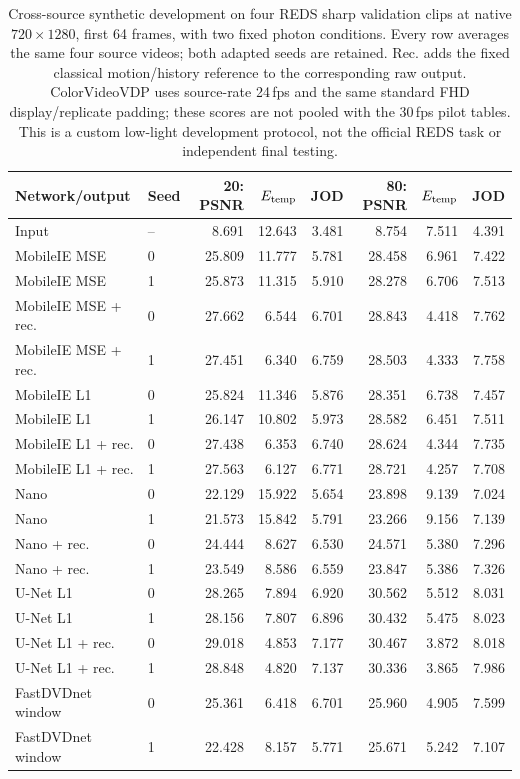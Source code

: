\begin{table}[!htbp]
\centering\small\setlength{\tabcolsep}{3pt}
\caption{Cross-source synthetic development on four REDS sharp validation clips at native $720\times1280$, first 64 frames, with two fixed photon conditions. Every row averages the same four source videos; both adapted seeds are retained. Rec. adds the fixed classical motion/history reference to the corresponding raw output. ColorVideoVDP uses source-rate 24\,fps and the same standard FHD display/replicate padding; these scores are not pooled with the 30\,fps pilot tables. This is a custom low-light development protocol, not the official REDS task or independent final testing.}
\label{tab:external-reds}
\begin{tabular}{llrrrrrr}
\toprule
Network/output & Seed & 20: PSNR & $E_{\rm temp}$ & JOD & 80: PSNR & $E_{\rm temp}$ & JOD\\
\midrule
Input & -- & 8.691 & 12.643 & 3.481 & 8.754 & 7.511 & 4.391\\
MobileIE MSE & 0 & 25.809 & 11.777 & 5.781 & 28.458 & 6.961 & 7.422\\
MobileIE MSE & 1 & 25.873 & 11.315 & 5.910 & 28.278 & 6.706 & 7.513\\
MobileIE MSE + rec. & 0 & 27.662 & 6.544 & 6.701 & 28.843 & 4.418 & 7.762\\
MobileIE MSE + rec. & 1 & 27.451 & 6.340 & 6.759 & 28.503 & 4.333 & 7.758\\
MobileIE L1 & 0 & 25.824 & 11.346 & 5.876 & 28.351 & 6.738 & 7.457\\
MobileIE L1 & 1 & 26.147 & 10.802 & 5.973 & 28.582 & 6.451 & 7.511\\
MobileIE L1 + rec. & 0 & 27.438 & 6.353 & 6.740 & 28.624 & 4.344 & 7.735\\
MobileIE L1 + rec. & 1 & 27.563 & 6.127 & 6.771 & 28.721 & 4.257 & 7.708\\
Nano & 0 & 22.129 & 15.922 & 5.654 & 23.898 & 9.139 & 7.024\\
Nano & 1 & 21.573 & 15.842 & 5.791 & 23.266 & 9.156 & 7.139\\
Nano + rec. & 0 & 24.444 & 8.627 & 6.530 & 24.571 & 5.380 & 7.296\\
Nano + rec. & 1 & 23.549 & 8.586 & 6.559 & 23.847 & 5.386 & 7.326\\
U-Net L1 & 0 & 28.265 & 7.894 & 6.920 & 30.562 & 5.512 & 8.031\\
U-Net L1 & 1 & 28.156 & 7.807 & 6.896 & 30.432 & 5.475 & 8.023\\
U-Net L1 + rec. & 0 & 29.018 & 4.853 & 7.177 & 30.467 & 3.872 & 8.018\\
U-Net L1 + rec. & 1 & 28.848 & 4.820 & 7.137 & 30.336 & 3.865 & 7.986\\
FastDVDnet window & 0 & 25.361 & 6.418 & 6.701 & 25.960 & 4.905 & 7.599\\
FastDVDnet window & 1 & 22.428 & 8.157 & 5.771 & 25.671 & 5.242 & 7.107\\
\bottomrule
\end{tabular}
\end{table}
